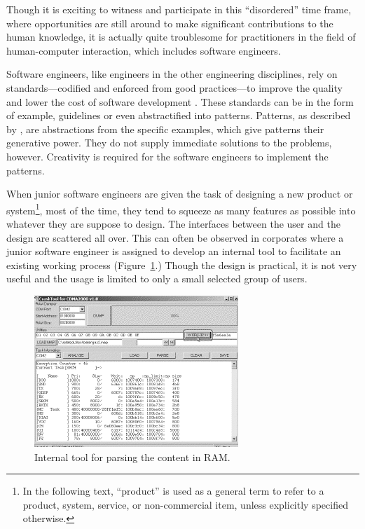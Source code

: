 \documentclass{acm_proc_article-sp}
\begin{document}
Though it is exciting to witness and participate in this
``disordered'' time frame, where opportunities are still around to
make significant contributions to the human knowledge, it is actually
quite troublesome for practitioners in the field of human-computer
interaction, which includes software engineers.

Software engineers, like engineers in the other engineering
disciplines, rely on standards---codified and enforced from good
practices---to improve the quality and lower the cost of software
development \citep{practice:ipenz}. These standards can be in the form
of example, guidelines or even abstractified into patterns. Patterns,
as described by \citet{patterns:griffiths}, are abstractions from the
specific examples, which give patterns their generative power. They do
not supply immediate solutions to the problems, however. Creativity is
required for the software engineers to implement the patterns.












When junior software engineers are given the task of designing a new
product or system\footnote{In the following text, ``product'' is used
  as a general term to refer to a product, system, service, or
  non-commercial item, unless explicitly specified otherwise.}, most
of the time, they tend to squeeze as many features as possible into
whatever they are suppose to design. The interfaces between the user
and the design are scattered all over. This can often be observed in
corporates where a junior software engineer is assigned to develop an
internal tool to facilitate an existing working process
(Figure~\ref{fig:featureful}.)  Though the design is practical, it is
not very useful and the usage is limited to only a small selected
group of users.

\begin{figure}[!t]
\centering
\includegraphics[width=.7\columnwidth]{featureful}
\caption{Internal tool for parsing the content in RAM.}
\label{fig:featureful}
\end{figure}
\end{document}

